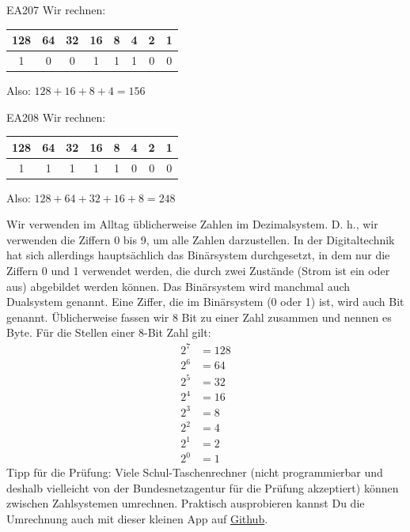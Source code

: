 \begin{sol}{EA207}
  Wir rechnen:
  \begin{center}
\begin{tabular}{|c|c|c|c|c|c|c|c|} 
128& 64&32&16 &8 & 4 & 2 & 1 \\ \hline
1&0&0&1&1&1&0&0
\end{tabular}
\end{center}
Also: $128+16+8+4 = 156$ 
\end{sol}  


\begin{sol}{EA208}
  Wir rechnen:
  \begin{center}
\begin{tabular}{|c|c|c|c|c|c|c|c|} 
128& 64&32&16 &8 & 4 & 2 & 1 \\ \hline
1&1&1&1&1&0&0&0
\end{tabular}
\end{center}
Also: $128+64+32+16+8 = 248$ 
\end{sol}  

\begin{ohmchapter}
  Wir verwenden im Alltag üblicherweise Zahlen im Dezimalsystem. D. h., wir verwenden die Ziffern 0 bis 9, um alle Zahlen darzustellen.
  In der Digitaltechnik hat sich allerdings hauptsächlich das Binärsystem durchgesetzt, in dem nur die Ziffern 0 und 1 verwendet werden, die durch zwei Zustände (Strom ist ein oder aus) abgebildet werden können.  Das Binärsystem wird manchmal auch Dualsystem genannt.
   Eine Ziffer, die im Binärsystem (0 oder 1) ist, wird auch Bit genannt.
  Üblicherweise fassen wir 8 Bit zu einer Zahl zusammen und nennen es Byte.
  Für die Stellen einer 8-Bit Zahl gilt:  
  \begin{align*}
    2^7 &= 128 \\         
    2^6 &= 64 \\
    2^5 &= 32 \\  
    2^4 &= 16 \\         
    2^3 &= 8  \\
    2^2 &= 4 \\         
    2^1 &= 2  \\   
    2^0 &= 1  
  \end{align*}  
Tipp für die Prüfung: Viele Schul-Taschenrechner (nicht programmierbar und deshalb vielleicht von der Bundesnetzagentur für die Prüfung akzeptiert) können zwischen Zahlsystemen umrechnen.
Praktisch ausprobieren kannst Du die Umrechnung auch mit dieser kleinen App auf \href{https://fritzsche.github.io/klasse-e/binary.html}{Github}.

\end{ohmchapter}


